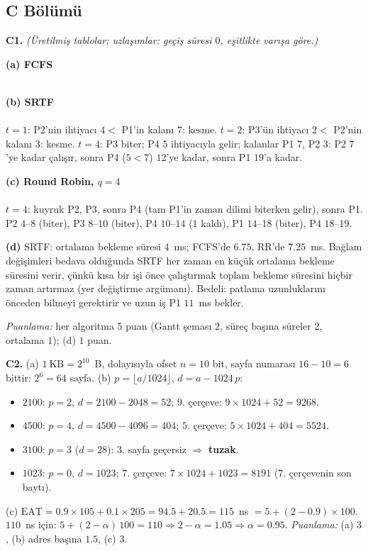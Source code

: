 \documentclass[11pt,a4paper]{article}
\begin{document}
\subsection*{C Bölümü}
\textbf{C1.} \textit{(Üretilmiş tablolar; uzlaşımlar: geçiş süresi $0$, eşitlikte varışa göre.)}

\textbf{(a) FCFS}\\[0.2em]
\\[0.3em]
{\small{}}

\textbf{(b) SRTF}\\[0.2em]
\\[0.3em]
$t=1$: P2'nin ihtiyacı $4 <$ P1'in kalanı $7$: kesme. $t=2$: P3'ün ihtiyacı $2 <$ P2'nin kalanı $3$: kesme. $t=4$: P3 biter; P4 $5$ ihtiyacıyla gelir; kalanlar P1 $7$, P2 $3$: P2 $7$'ye kadar çalışır, sonra P4 ($5 < 7$) $12$'ye kadar, sonra P1 $19$'a kadar.\\
{\small{}}

\textbf{(c) Round Robin, $q = 4$}\\[0.2em]
\\[0.3em]
$t=4$: kuyruk P2, P3, sonra P4 (tam P1'in zaman dilimi biterken gelir), sonra P1. P2 $4$--$8$ (biter), P3 $8$--$10$ (biter), P4 $10$--$14$ ($1$ kaldı), P1 $14$--$18$ (biter), P4 $18$--$19$.\\
{\small{}}

\textbf{(d)} SRTF: ortalama bekleme süresi $4$~ms; FCFS'de $6.75$, RR'de $7.25$~ms. Bağlam değişimleri bedava olduğunda SRTF her zaman en küçük ortalama bekleme süresini verir, çünkü kısa bir işi önce çalıştırmak toplam bekleme süresini hiçbir zaman artırmaz (yer değiştirme argümanı). Bedeli: patlama uzunluklarını önceden bilmeyi gerektirir ve uzun iş P1 $11$~ms bekler.

\textit{Puanlama:} her algoritma $5$ puan (Gantt şeması $2$, süreç başına süreler $2$, ortalama $1$); (d) $1$ puan.

\textbf{C2.} (a) $1\ \text{KB} = 2^{10}$~B, dolayısıyla ofset $n = 10$ bit, sayfa numarası $16 - 10 = 6$ bittir: $2^{6} = 64$ sayfa.
(b) $p = \lfloor a/1024 \rfloor$, $d = a - 1024\,p$:
\begin{itemize}
  \item $2100$: $p = 2$, $d = 2100 - 2048 = 52$; $9$. çerçeve: $9 \times 1024 + 52 = 9268$.
  \item $4500$: $p = 4$, $d = 4500 - 4096 = 404$; $5$. çerçeve: $5 \times 1024 + 404 = 5524$.
  \item $3100$: $p = 3$ ($d = 28$): $3$. sayfa geçersiz $\Rightarrow$ \textbf{tuzak}.
  \item $1023$: $p = 0$, $d = 1023$; $7$. çerçeve: $7 \times 1024 + 1023 = 8191$ ($7$. çerçevenin son baytı).
\end{itemize}
(c) $\text{EAT} = 0.9 \times 105 + 0.1 \times 205 = 94.5 + 20.5 = 115$~ns $= 5 + (2 - 0.9)\times100$. $110$~ns için: $5 + (2-\alpha)\,100 = 110 \Rightarrow 2 - \alpha = 1.05 \Rightarrow \alpha = 0.95$.
\textit{Puanlama:} (a) $3$, (b) adres başına $1.5$, (c) $3$.
\end{document}
